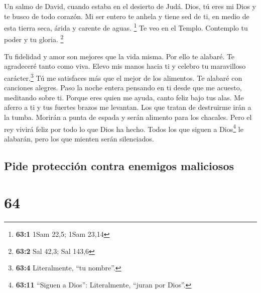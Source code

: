 Un salmo de David, cuando estaba en el desierto de Judá. 
Dios, tú eres mi Dios y te busco de todo corazón. Mi ser entero te
anhela y tiene sed de ti, en medio de esta tierra seca, árida y carente
de aguas. \footnote{\textbf{63:1} 1Sam 22,5; 1Sam 23,14} 
Te veo en el Templo. Contemplo tu poder y tu gloria. \footnote{\textbf{63:2}
  Sal 42,3; Sal 143,6}

 Tu fidelidad y amor son mejores que la vida misma. Por
ello te alabaré.  Te agradeceré tanto como viva. Elevo mis
manos hacia ti y celebro tu maravilloso carácter.\footnote{\textbf{63:4}
  Literalmente, ``tu nombre''.}  Tú me satisfaces más que
el mejor de los alimentos. Te alabaré con canciones alegres.
 Paso la noche entera pensando en ti desde que me acuesto,
meditando sobre ti.  Porque eres quien me ayuda, canto
feliz bajo tus alas.  Me aferro a ti y tus fuertes brazos
me levantan.  Los que tratan de destruirme irán a la
tumba.  Morirán a punta de espada y serán alimento para
los chacales.  Pero el rey vivirá feliz por todo lo que
Dios ha hecho. Todos los que siguen a Dios\footnote{\textbf{63:11}
  ``Siguen a Dios'': Literalmente, ``juran por Dios''.} le alabarán,
pero los que mienten serán silenciados.

\hypertarget{pide-protecciuxf3n-contra-enemigos-maliciosos}{%
\subsection{Pide protección contra enemigos
maliciosos}\label{pide-protecciuxf3n-contra-enemigos-maliciosos}}

\hypertarget{section-63}{%
\section{64}\label{section-63}}


